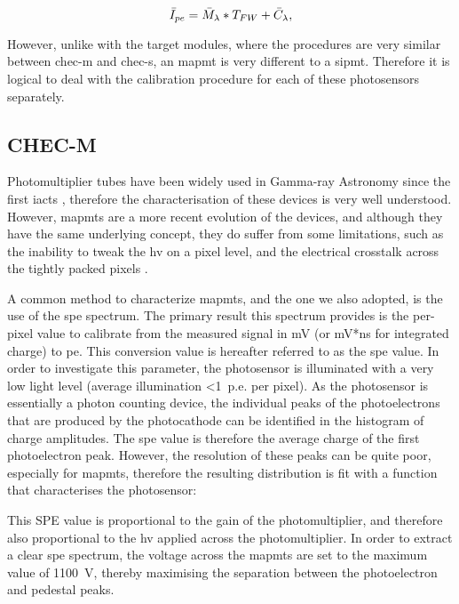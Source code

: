 \begin{equation} \label{eq:photosensor_calibration}


\average{I}_{pe} = \average{M}_\lambda * T_{FW} + \average{C}_\lambda,
\end{equation}


However, unlike with the \gls{target} modules, where the procedures are very similar between \gls{chec-m} and \gls{chec-s}, an \gls{mapmt} is very different to a \gls{sipmt}. Therefore it is logical to deal with the calibration procedure for each of these photosensors separately.

\subsection{CHEC-M}

Photomultiplier tubes have been widely used in Gamma-ray Astronomy since the first \glspl{iact} , therefore the characterisation of these devices is very well understood. However, \glspl{mapmt} are a more recent evolution of the devices, and although they have the same underlying concept, they do suffer from some limitations, such as the inability to tweak the \gls{hv} on a pixel level, and the electrical crosstalk across the tightly packed pixels .

A common method to characterize \glspl{mapmt}, and the one we also adopted, is the use of the \gls{spe} spectrum. The primary result this spectrum provides is the per-pixel value to calibrate from the measured signal in mV (or mV*ns for integrated charge) to \gls{pe}. This conversion value is hereafter referred to as the \gls{spe} value. In order to investigate this parameter, the photosensor is illuminated with a very low light level (average illumination <1~p.e. per pixel). As the photosensor is essentially a photon counting device, the individual peaks of the photoelectrons that are produced by the photocathode can be identified in the histogram of charge amplitudes. The \gls{spe} value is therefore the average charge of the first photoelectron peak. However, the resolution of these peaks can be quite poor, especially for \glspl{mapmt}, therefore the resulting distribution is fit with a function that characterises the photosensor: 


This SPE value is proportional to the gain of the photomultiplier, and therefore also proportional to the \gls{hv} applied across the photomultiplier. In order to extract a clear \gls{spe} spectrum, the voltage across the \glspl{mapmt} are set to the maximum value of 1100~V, thereby maximising the separation between the photoelectron and pedestal peaks.

